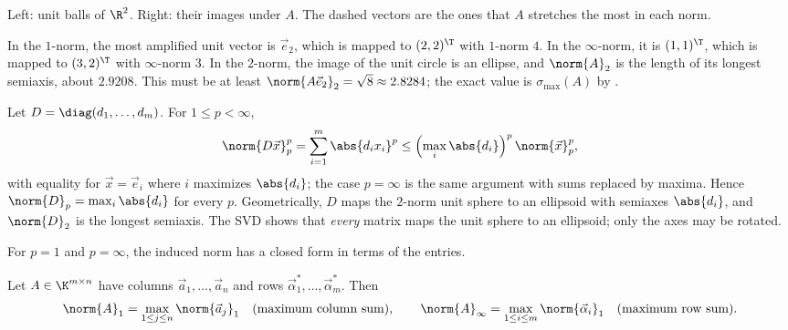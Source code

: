 \begin{example}
\begin{center}
  \small Left: unit balls of $\R^2$. Right: their images under $A$. The dashed vectors are the ones that $A$ stretches the most in each norm.
  \end{center}

  In the $1$-norm, the most amplified unit vector is $\vec{e}_2$, which is mapped to $(2, 2)^\T$ with $1$-norm $4$. In the $\infty$-norm, it is $(1, 1)^\T$, which is mapped to $(3, 2)^\T$ with $\infty$-norm $3$. In the $2$-norm, the image of the unit circle is an ellipse, and $\norm{A}_2$ is the length of its longest semiaxis, about $2.9208$. This must be at least $\norm{A\vec{e}_2}_2 = \sqrt{8} \approx 2.8284$; the exact value is $\sigma_{\max}(A)$ by .
\end{example}

\begin{example}
  Let $D = \diag(d_1, \dots, d_m)$. For $1 \le p < \infty$,
  \begin{equation}
    \norm{D\vec{x}}_p^p = \sum_{i=1}^{m}\abs{d_ix_i}^p \le \left(\max_i\abs{d_i}\right)^p\norm{\vec{x}}_p^p,
  \end{equation}
  with equality for $\vec{x} = \vec{e}_i$ where $i$ maximizes $\abs{d_i}$; the case $p = \infty$ is the same argument with sums replaced by maxima. Hence $\norm{D}_p = \max_i\abs{d_i}$ for every $p$. Geometrically, $D$ maps the $2$-norm unit sphere to an ellipsoid with semiaxes $\abs{d_i}$, and $\norm{D}_2$ is the longest semiaxis. The SVD shows that \emph{every} matrix maps the unit sphere to an ellipsoid; only the axes may be rotated.
\end{example}

For $p = 1$ and $p = \infty$, the induced norm has a closed form in terms of the entries.

\begin{proposition}
  \label{prop:one-inf-norm}
  Let $A \in \K^{m \times n}$ have columns $\vec{a}_1, \dots, \vec{a}_n$ and rows $\vec{\alpha}_1^\ast, \dots, \vec{\alpha}_m^\ast$. Then
  \begin{equation}
    \norm{A}_1 = \max_{1 \le j \le n}\norm{\vec{a}_j}_1 \quad\text{(maximum column sum)}, \qquad \norm{A}_\infty = \max_{1 \le i \le m}\norm{\vec{\alpha}_i}_1 \quad\text{(maximum row sum)}.
  \end{equation}
\end{proposition}


